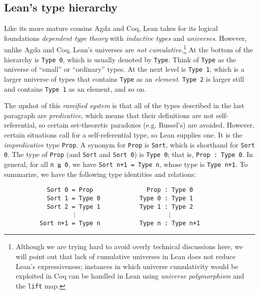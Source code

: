 \documentclass[11pt]{amsart}  %
\begin{document}
\subsection{Lean's type hierarchy}
\label{sec:leans-hierarchy-of-sorts-and-types}
Like its more mature cousins Agda and Coq, Lean takes for its logical foundations \emph{dependent type theory} with \emph{inductive types} and \emph{universes}. However, unlike Agda and Coq, Lean's universes are \emph{not cumulative}.\footnote{Although we are trying hard to avoid overly technical discussions here, we will point out that lack of cumulative universes in Lean does not reduce Lean's expressiveness; instances in which universe cumulativity would be exploited in Coq can be handled in Lean using \emph{universe polymorphism} and the \lstinline{lift} map.}
At the bottom of the hierarchy is \lstinline{Type 0}, which is usually denoted by \lstinline{Type}.
Think of  \lstinline{Type} as the universe of ``small'' or ``ordinary'' types.  At the next level is \lstinline{Type 1}, which is a larger universe of types that contains \lstinline{Type} as an \emph{element}. \lstinline{Type 2} is  larger still and contains  \lstinline{Type 1} as an element, and so on. 

The upshot of this \emph{ramified system} is that all of the types described in the last paragraph are \emph{predicative}, which means that their definitions are not self-referential, so certain set-theoretic paradoxes (e.g. Russel's) are avoided. However, certain situations call for a self-referential type, so Lean supplies one. It is the \emph{impredicative} type \lstinline{Prop}.
A synonym for \lstinline{Prop} is \lstinline{Sort}, which is shorthand for \lstinline{Sort 0}. The type of \lstinline{Prop} (and \lstinline{Sort} and  \lstinline{Sort 0}) is \lstinline{Type 0}; that is, \lstinline{Prop : Type 0}. In general, for all \lstinline{n ≧ 0}, 
we have 
\lstinline{Sort n+1 = Type n}, whose type is \lstinline{Type n+1}. 
To summarize, we have the following type identities and relations:
\begin{lstlisting}
            Sort 0 = Prop               Prop : Type 0
            Sort 1 = Type 0           Type 0 : Type 1
            Sort 2 = Type 1           Type 1 : Type 2
                   ⋮                         ⋮
          Sort n+1 = Type n           Type n : Type n+1
\end{lstlisting}
\end{document}
